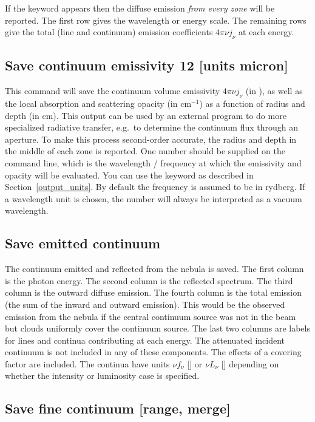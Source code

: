 If the keyword  appears then the diffuse emission
\emph{from every zone} will be reported.
The first row gives the wavelength or energy scale.
The remaining rows give the total (line and continuum)
emission coefficients $4 \pi \nu j_{\nu}$
at each energy.

\subsection{Save continuum emissivity 12 [units micron]}

This command will save the continuum volume emissivity $4\pi \nu j_\nu$ (in
\ergpccmps), as well as the local absorption and scattering opacity (in
cm$^{-1}$) as a function of radius and depth (in cm). This output can be used by an
external program to do more specialized radiative transfer, e.g.\ to determine
the continuum flux through an aperture. To make this process second-order
accurate, the radius and depth in the middle of each zone is reported. One number should
be supplied on the command line, which is the wavelength / frequency at which
the emissivity and opacity will be evaluated. You can use the keyword
 as described in Section~\ref{output_units}. By default the
frequency is assumed to be in rydberg. If a wavelength unit is chosen, the number
will always be interpreted as a vacuum wavelength.

\subsection{Save emitted continuum}

The continuum emitted and reflected from the nebula is saved.
The
first column is the photon energy.
The second column is the reflected
spectrum.
The third column is the outward diffuse emission.
The fourth
column is the total emission (the sum of the inward and outward emission).
This would be the observed emission from the nebula if the central continuum
source was not in the beam but clouds uniformly cover the continuum source.
The last two columns are labels for lines and continua contributing at each
energy.
The attenuated incident continuum is not included in any of these
components.
The effects of a covering factor are included.
The continua have units
$\nu f_{\nu}$ [\ergpscmps ] or $\nu L_{\nu}$ [\ergps ] 
depending on whether the intensity or luminosity case is specified.

\subsection{Save fine continuum [range, merge]}


